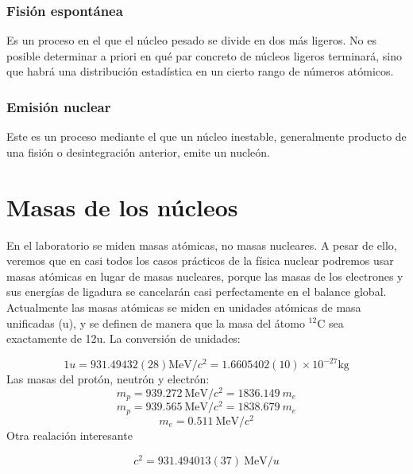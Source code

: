 \subsubsection{Fisión espontánea}

Es un proceso  en el que el núcleo pesado se divide en dos más ligeros. No es posible determinar a priori en qué par concreto de núcleos ligeros terminará, sino que habrá una distribución estadística en un cierto rango de números atómicos.

\subsubsection{Emisión nuclear}

Este es un proceso mediante el que un núcleo inestable, generalmente producto de una fisión o desintegración anterior, emite un nucleón.

\section{Masas de los núcleos}

En el laboratorio se miden masas atómicas, no masas nucleares. A pesar de ello, veremos que en casi todos los casos prácticos de la física nuclear podremos usar masas atómicas en lugar de masas nucleares, porque las masas de los electrones y sus energías de ligadura se cancelarán casi perfectamente en el balance global. Actualmente las masas atómicas se miden en unidades atómicas de masa unificadas (u), y se definen de manera que la masa del átomo $^{12}$C sea exactamente de 12u. La conversión de unidades:

\begin{equation}
	1u = 931.49432(28) \unit{\MeV/c^2} = 1.6605402(10) \times 10^{-27} \unit{\kg}
\end{equation}
Las masas del protón, neutrón y electrón:
\begin{equation}
	m_p = 939.272  \ \unit{\MeV/c^2} = 1836.149 \ m_e
\end{equation} 
\begin{equation}
	m_p = 939.565 \ \unit{\MeV/c^2} = 1838.679 \ m_e
\end{equation}
\begin{equation}
	m_e = 0.511 \ \unit{\MeV/c^2}
\end{equation}
Otra realación interesante

\begin{equation}
	c^2 = 931.494013(37)\ \unit{\MeV/u}
\end{equation}

